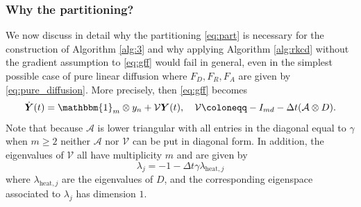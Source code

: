 \documentclass[10pt,a4paper]{article}
\newtheorem{remark}[theorem]{Remark}
\def \calA{\mathcal{A}}
\begin{document}





\subsubsection{Why the partitioning?}
We now discuss in detail why the partitioning \eqref{eq:part} is necessary for the construction of   Algorithm \ref{alg:3} and why applying  Algorithm \ref{alg:rkcd} without the gradient assumption to \eqref{eq:gff} would fail in general, even in the simplest possible case of pure linear diffusion where $F_{D}, F_{R}, F_{A}$ are given by \eqref{eq:pure_diffusion}.  More precisely, then  \eqref{eq:gff} becomes
\begin{equation}\label{eq:naive_sdirk4}
\dot{ \boldsymbol{Y}}(t)= \mathbbm{1}_{m} \otimes y_{n} +\mathcal{V} \boldsymbol{Y}(t), 
\quad 
\mathcal{V}\coloneqq-I_{md}-\Delta t (\calA \otimes D).
\end{equation}
Note that because $\calA$ is lower triangular with all entries in the diagonal equal to $\gamma$ when $m \geq 2$ neither $\calA$ nor $\mathcal{V}$ can be put 
in diagonal form. In addition, the eigenvalues of $\mathcal{V}$ all have multiplicity $m$ and are given by 
\[
\lambda_{j}=-1-\Delta t \gamma \lambda_{\text{heat},j}  
\]
where $\lambda_{\text{heat},j}$ are the eigenvalues of $D$, and the corresponding eigenspace associated to $\lambda_{j}$ has dimension $1$. 
\end{document}
